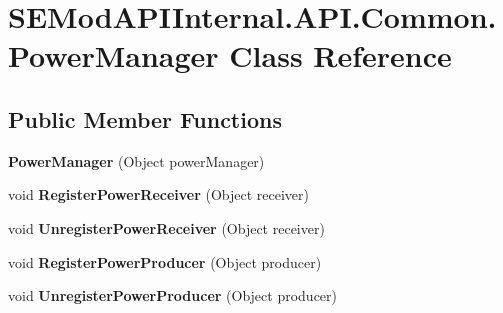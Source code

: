 \hypertarget{class_s_e_mod_a_p_i_internal_1_1_a_p_i_1_1_common_1_1_power_manager}{}\section{S\+E\+Mod\+A\+P\+I\+Internal.\+A\+P\+I.\+Common.\+Power\+Manager Class Reference}
\label{class_s_e_mod_a_p_i_internal_1_1_a_p_i_1_1_common_1_1_power_manager}
\subsection*{Public Member Functions}
\begin{DoxyCompactItemize}
\item 
\hypertarget{class_s_e_mod_a_p_i_internal_1_1_a_p_i_1_1_common_1_1_power_manager_a42a3f72615473c4774023fb31717d20d}{}{\bfseries Power\+Manager} (Object power\+Manager)\label{class_s_e_mod_a_p_i_internal_1_1_a_p_i_1_1_common_1_1_power_manager_a42a3f72615473c4774023fb31717d20d}

\item 
\hypertarget{class_s_e_mod_a_p_i_internal_1_1_a_p_i_1_1_common_1_1_power_manager_ac40da6ab833e1caa465a2edc617d510c}{}void {\bfseries Register\+Power\+Receiver} (Object receiver)\label{class_s_e_mod_a_p_i_internal_1_1_a_p_i_1_1_common_1_1_power_manager_ac40da6ab833e1caa465a2edc617d510c}

\item 
\hypertarget{class_s_e_mod_a_p_i_internal_1_1_a_p_i_1_1_common_1_1_power_manager_a959007b675eb1d3ae2a0e3a7a8fd8d05}{}void {\bfseries Unregister\+Power\+Receiver} (Object receiver)\label{class_s_e_mod_a_p_i_internal_1_1_a_p_i_1_1_common_1_1_power_manager_a959007b675eb1d3ae2a0e3a7a8fd8d05}

\item 
\hypertarget{class_s_e_mod_a_p_i_internal_1_1_a_p_i_1_1_common_1_1_power_manager_aafa86ac0a9950a97e87908a9c20d7833}{}void {\bfseries Register\+Power\+Producer} (Object producer)\label{class_s_e_mod_a_p_i_internal_1_1_a_p_i_1_1_common_1_1_power_manager_aafa86ac0a9950a97e87908a9c20d7833}

\item 
\hypertarget{class_s_e_mod_a_p_i_internal_1_1_a_p_i_1_1_common_1_1_power_manager_a2d5db2adb78f1cfdf478e421c21afafb}{}void {\bfseries Unregister\+Power\+Producer} (Object producer)\label{class_s_e_mod_a_p_i_internal_1_1_a_p_i_1_1_common_1_1_power_manager_a2d5db2adb78f1cfdf478e421c21afafb}

\end{DoxyCompactItemize}
